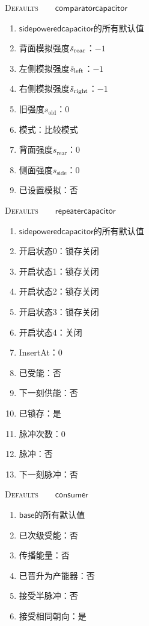 \documentclass[a4,11pt]{aleph-notas}
\begin{document}
\begin{codigo}
\textsc{Defaults}\ \ \ \ $\mathsf{comparatorcapacitor}$
\begin{enumerate}
  \setlength{\itemsep}{1pt}
  \setlength{\parskip}{0pt}
  \setlength{\parsep}{0pt}
    \item $\mathsf{sidepoweredcapacitor}$的所有默认值
    \item 背面模拟强度$\Tilde{s}_{\mathrm{rear}}$：$-1$
    \item 左侧模拟强度$\Tilde{s}_{\mathrm{left}}$：$-1$
    \item 右侧模拟强度$\Tilde{s}_{\mathrm{right}}$：$-1$
    \item 旧强度$s_{\mathrm{old}}$：$0$
    \item 模式：比较模式
    \item 背面强度$s_{\mathrm{rear}}$：$0$
    \item 侧面强度$s_{\mathrm{side}}$：$0$
    \item 已设置模拟：否
\end{enumerate}
\end{codigo}

\begin{codigo}
\textsc{Defaults}\ \ \ \ $\mathsf{repeatercapacitor}$
\begin{enumerate}
  \setlength{\itemsep}{1pt}
  \setlength{\parskip}{0pt}
  \setlength{\parsep}{0pt}
    \item $\mathsf{sidepoweredcapacitor}$的所有默认值
    \item 开启状态0：锁存关闭
    \item 开启状态1：锁存关闭
    \item 开启状态2：锁存关闭
    \item 开启状态3：锁存关闭
    \item 开启状态4：关闭
    \item InsertAt：$0$
    \item 已受能：否
    \item 下一刻供能：否
    \item 已锁存：是
    \item 脉冲次数：$0$
    \item 脉冲：否
    \item 下一刻脉冲：否
\end{enumerate}
\end{codigo}

\begin{codigo}
\textsc{Defaults}\ \ \ \ $\mathsf{consumer}$
\begin{enumerate}
  \setlength{\itemsep}{1pt}
  \setlength{\parskip}{0pt}
  \setlength{\parsep}{0pt}
    \item $\mathsf{base}$的所有默认值
    \item 已次级受能：否
    \item 传播能量：否
    \item 已晋升为产能器：否
    \item 接受半脉冲：否
    \item 接受相同朝向：是
\end{enumerate}
\end{codigo}
\end{document}
